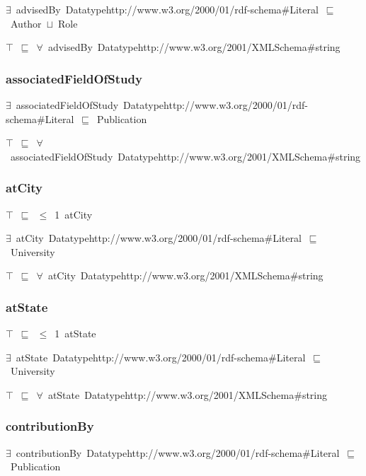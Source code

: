 \documentclass{article}
\begin{document}
\ensuremath{\exists}~advisedBy~Datatypehttp://www.w3.org/2000/01/rdf-schema#Literal~\ensuremath{\sqsubseteq}~Author~\ensuremath{\sqcup}~Role

\ensuremath{\top}~\ensuremath{\sqsubseteq}~\ensuremath{\forall}~advisedBy~Datatypehttp://www.w3.org/2001/XMLSchema#string

\subsubsection*{associatedFieldOfStudy}

\ensuremath{\exists}~associatedFieldOfStudy~Datatypehttp://www.w3.org/2000/01/rdf-schema#Literal~\ensuremath{\sqsubseteq}~Publication

\ensuremath{\top}~\ensuremath{\sqsubseteq}~\ensuremath{\forall}~associatedFieldOfStudy~Datatypehttp://www.w3.org/2001/XMLSchema#string

\subsubsection*{atCity}

\ensuremath{\top}~\ensuremath{\sqsubseteq}~\ensuremath{\leq}~1~atCity

\ensuremath{\exists}~atCity~Datatypehttp://www.w3.org/2000/01/rdf-schema#Literal~\ensuremath{\sqsubseteq}~University

\ensuremath{\top}~\ensuremath{\sqsubseteq}~\ensuremath{\forall}~atCity~Datatypehttp://www.w3.org/2001/XMLSchema#string

\subsubsection*{atState}

\ensuremath{\top}~\ensuremath{\sqsubseteq}~\ensuremath{\leq}~1~atState

\ensuremath{\exists}~atState~Datatypehttp://www.w3.org/2000/01/rdf-schema#Literal~\ensuremath{\sqsubseteq}~University

\ensuremath{\top}~\ensuremath{\sqsubseteq}~\ensuremath{\forall}~atState~Datatypehttp://www.w3.org/2001/XMLSchema#string

\subsubsection*{contributionBy}

\ensuremath{\exists}~contributionBy~Datatypehttp://www.w3.org/2000/01/rdf-schema#Literal~\ensuremath{\sqsubseteq}~Publication
\end{document}
